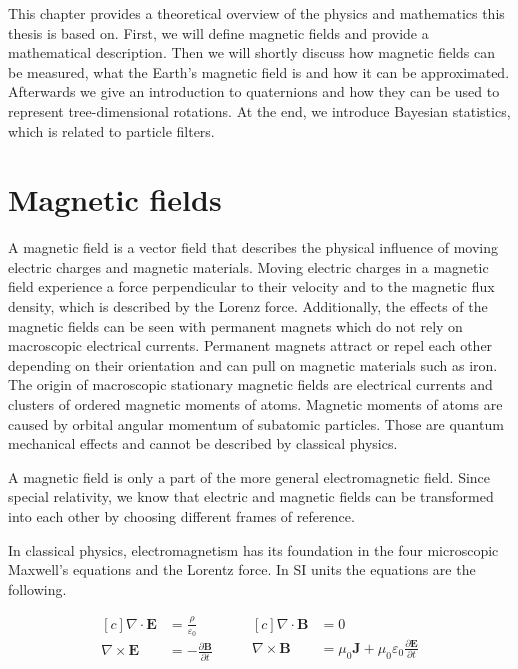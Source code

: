 This chapter provides a theoretical overview of the physics and mathematics this thesis is based on. First, we will define magnetic fields and provide a mathematical description. Then we will shortly discuss how magnetic fields can be measured, what the Earth's magnetic field is and how it can be approximated. Afterwards we give an introduction to quaternions and how they can be used to represent tree-dimensional rotations. At the end, we introduce Bayesian statistics, which is related to particle filters.

\section{Magnetic fields}

A magnetic field is a vector field that describes the physical influence of moving electric charges and magnetic materials. Moving electric charges in a magnetic field experience a force perpendicular to their velocity and to the magnetic flux density, which is described by the Lorenz force. Additionally, the effects of the magnetic fields can be seen with permanent magnets which do not rely on macroscopic electrical currents. Permanent magnets attract or repel each other depending on their orientation and can pull on magnetic materials such as iron. The origin of macroscopic stationary magnetic fields are electrical currents and clusters of ordered magnetic moments of atoms. Magnetic moments of atoms are caused by orbital angular momentum of subatomic particles. Those are quantum mechanical effects and cannot be described by classical physics.

A magnetic field is only a part of the more general electromagnetic field. Since special relativity, we know that electric and magnetic fields can be transformed into each other by choosing different frames of reference.

In classical physics, electromagnetism has its foundation in the four microscopic Maxwell's equations and the Lorentz force. In SI units the equations are the following.

\begin{equation}
\label{eq:maxwell_micro}
    \begin{aligned}[c]
        \nabla \cdot \bm{E} &= \frac{\rho}{\varepsilon_0}\\
        \nabla \times \bm{E} &= -\frac{\partial \bm{B}}{\partial t}\\
    \end{aligned}
    \qquad
    \begin{aligned}[c]
        \nabla \cdot \bm{B} &= 0\\
        \nabla \times \bm{B} &= \mu_0 \bm{J} + \mu_0 \varepsilon_0 \frac{\partial \bm{E}}{\partial t}\\
    \end{aligned}
\end{equation}

